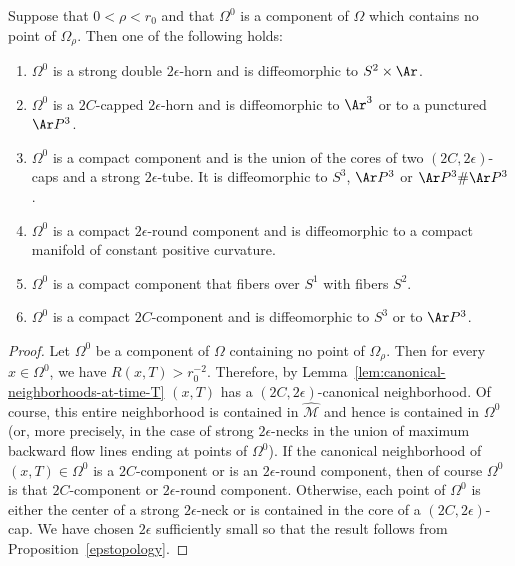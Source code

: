 \begin{lemma}
\label{lem:omega-component-classification}
Suppose that $0<\rho<r_0$ and that $\Omega^0$ is a component of
$\Omega$ which contains no point of $\Omega_\rho$. Then one of the
following holds:
\begin{enumerate}
\item[(1)] $\Omega^0$ is a strong double $2\epsilon$-horn and is diffeomorphic to $S^2\times \Ar$.
\item[(2)] $\Omega^0$ is a  $2C$-capped $2\epsilon$-horn and is diffeomorphic to $\Ar^3$
or to a punctured $\Ar P^3$.
\item[(3)] $\Omega^0$ is a compact component and is the union of the cores of
two $(2C,2\epsilon)$-caps and a strong $2\epsilon$-tube. It is
diffeomorphic to $S^3$, $\Ar P^3$ or $\Ar P^3\#\Ar P^3$.
\item[(4)] $\Omega^0$ is a compact $2\epsilon$-round component and is diffeomorphic to a compact
manifold of constant positive curvature.
\item[(5)] $\Omega^0$ is a compact component that fibers over $S^1$
with fibers $S^2$.
\item[(6)] $\Omega^0$ is a compact
$2C$-component and is diffeomorphic to $S^3$ or to $\Ar P^3$.
\end{enumerate}
\end{lemma}



\begin{proof}
Let $\Omega^0$ be a component of $\Omega$ containing no point of
$\Omega_\rho$. Then for every  $x\in \Omega^0$, we have
$R(x,T)>r_0^{-2}$.   Therefore, by Lemma~\ref{lem:canonical-neighborhoods-at-time-T} $(x,T)$
has a $(2C,2\epsilon)$-canonical neighborhood. Of course, this
entire neighborhood is contained in $\widehat{\mathcal M}$ and hence
is contained in $\Omega^0$ (or, more precisely, in the case of
strong $2\epsilon$-necks in the union of maximum backward flow lines
ending at points of $\Omega^0$). If the canonical neighborhood of
$(x,T)\in \Omega^0$ is a $2C$-component or is an $2\epsilon$-round
component, then of course $\Omega^0$ is that $2C$-component or
$2\epsilon$-round component. Otherwise, each point of $\Omega^0$ is
either the center of a strong $2\epsilon$-neck or is contained in
the core of a $(2C,2\epsilon)$-cap. We have chosen $2\epsilon$
sufficiently  small so that the result follows from
Proposition~\ref{epstopology}.
\end{proof}



